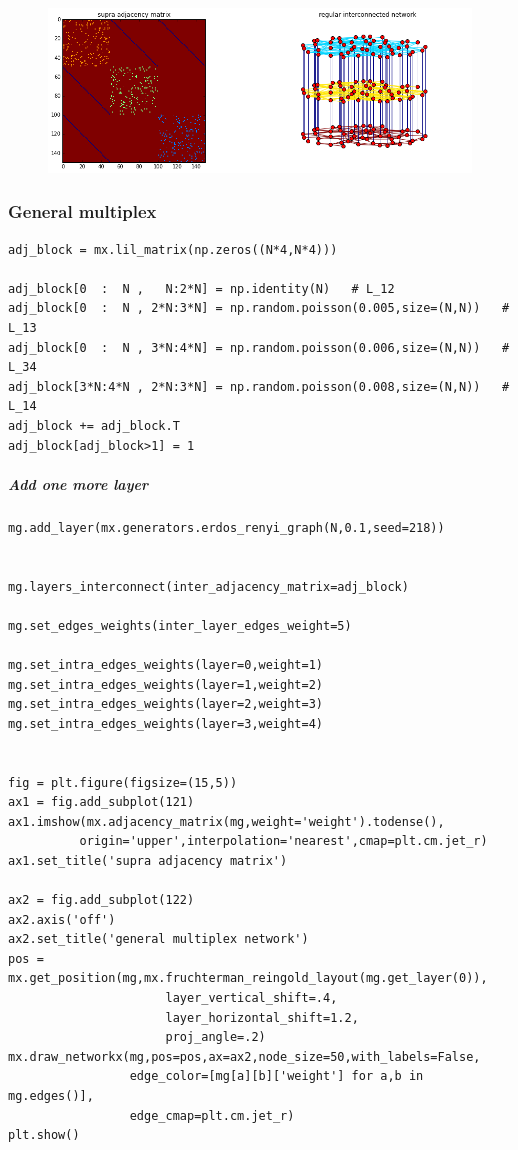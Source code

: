 \documentclass[11pt]{article}
\begin{document}
\begin{figure}[htbp]
\centering
\includegraphics[width=\textwidth]{output_51_0.png}
\end{figure}

\subsubsection{General multiplex}\label{general-multiplex}

\begin{verbatim}
adj_block = mx.lil_matrix(np.zeros((N*4,N*4)))

adj_block[0  :  N ,   N:2*N] = np.identity(N)   # L_12
adj_block[0  :  N , 2*N:3*N] = np.random.poisson(0.005,size=(N,N))   # L_13
adj_block[0  :  N , 3*N:4*N] = np.random.poisson(0.006,size=(N,N))   # L_34
adj_block[3*N:4*N , 2*N:3*N] = np.random.poisson(0.008,size=(N,N))   # L_14
adj_block += adj_block.T
adj_block[adj_block>1] = 1
\end{verbatim}

\subparagraph{Add one more layer}\label{add-one-more-layer}

\begin{verbatim}
mg.add_layer(mx.generators.erdos_renyi_graph(N,0.1,seed=218))


mg.layers_interconnect(inter_adjacency_matrix=adj_block)

mg.set_edges_weights(inter_layer_edges_weight=5)

mg.set_intra_edges_weights(layer=0,weight=1)
mg.set_intra_edges_weights(layer=1,weight=2)
mg.set_intra_edges_weights(layer=2,weight=3)
mg.set_intra_edges_weights(layer=3,weight=4)


fig = plt.figure(figsize=(15,5))
ax1 = fig.add_subplot(121)
ax1.imshow(mx.adjacency_matrix(mg,weight='weight').todense(),
          origin='upper',interpolation='nearest',cmap=plt.cm.jet_r)
ax1.set_title('supra adjacency matrix')

ax2 = fig.add_subplot(122)
ax2.axis('off')
ax2.set_title('general multiplex network')
pos = mx.get_position(mg,mx.fruchterman_reingold_layout(mg.get_layer(0)),
                      layer_vertical_shift=.4,
                      layer_horizontal_shift=1.2,
                      proj_angle=.2)
mx.draw_networkx(mg,pos=pos,ax=ax2,node_size=50,with_labels=False,
                 edge_color=[mg[a][b]['weight'] for a,b in mg.edges()],
                 edge_cmap=plt.cm.jet_r)
plt.show()
\end{verbatim}
\end{document}
